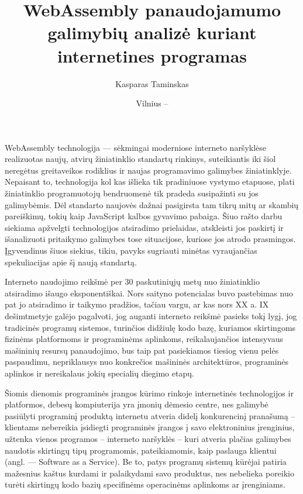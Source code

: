 \documentclass{VUMIFPSkursinis}
\title{WebAssembly panaudojamumo galimybių analizė kuriant internetines programas }
\author{Kasparas Taminskas}
\date{Vilnius – \the\year}
\begin{document}
\lstset{language=C}

\maketitle
\cleardoublepage{}
\setcounter{page}{2}

\tableofcontents

WebAssembly technologija — sėkmingai moderniose interneto naršyklėse realizuotas naujų, atvirų žiniatinklio standartų rinkinys, suteikiantis iki šiol neregėtus greitaveikos rodiklius ir naujas programavimo galimybes žiniatinklyje. Nepaisant to, technologija kol kas išlieka tik pradiniuose vystymo etapuose, plati žiniatinklio programuotojų bendruomenė tik pradeda susipažinti su jos galimybėmis. Dėl standarto naujovės dažnai pasigirsta tam tikrų mitų ar skambių pareiškimų, tokių kaip JavaScript kalbos gyvavimo pabaiga. Šiuo rašto darbu siekiama apžvelgti technologijos atsiradimo prielaidas, atskleisti jos paskirtį ir išanalizuoti pritaikymo galimybes tose situacijose, kuriose jos atrodo prasmingos. Įgyvendinus šiuos siekius, tikiu, pavyks sugriauti minėtas vyraujančias spekuliacijas apie šį naują standartą.

Interneto naudojimo reikšmė per 30 paskutiniųjų metų nuo žiniatinklio atsiradimo išaugo 
eksponentiškai. Nors saityno potencialas buvo pastebimas nuo pat jo atsiradimo ir taikymo pradžios, tačiau vargu, ar 
kas nors XX a. IX dešimtmetyje galėjo pagalvoti, jog auganti interneto reikšmė pasieks tokį 
lygį, jog tradicinės programų sistemos, turinčios didžiulę kodo bazę, kuriamos skirtingoms 
fizinėms platformoms ir programinėms aplinkoms, reikalaujančios intensyvaus mašininių resursų 
panaudojimo, bus taip pat pasiekiamos tiesiog vienu pelės paspaudimu, nepriklausys nuo 
konkrečios mašininės architektūros, programinės aplinkos ir nereikalaus jokių specialių 
diegimo etapų.

Šiomis dienomis programinės įrangos kūrimo rinkoje internetinės technologijos ir 
platformos, debesų kompiuterija yra įmonių dėmesio centre, nes galimybė pasiūlyti programinį 
produktą internetu atveria didelį konkurencinį pranašumą – klientams nebereikia įsidiegti 
programinės įrangos į savo elektroninius įrenginius, užtenka vienos programos – interneto 
naršyklės – kuri atveria plačias galimybes naudotis skirtingų tipų programomis, pateikiamomis, 
kaip paslauga klientui (angl. — Software as a Service). Be to, patys programų sistemų kūrėjai 
patiria mažesnius kaštus kurdami ir palaikydami savo produktus, nes nebelieka poreikio turėti 
skirtingų kodo bazių specifinėms operacinėms aplinkoms ar įrenginiams.
\end{document}
